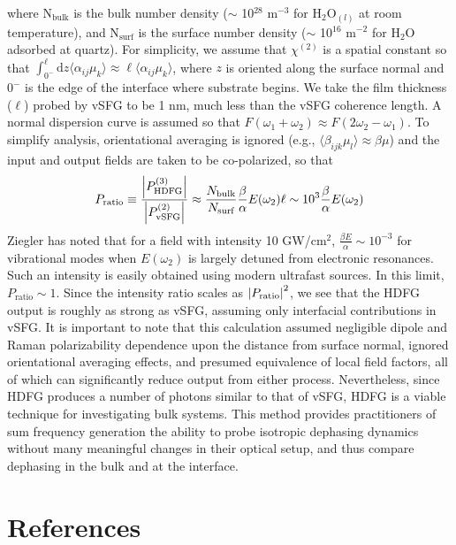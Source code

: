 \documentclass[aip, jcp, reprint, twocolumn]{revtex4-2}
\begin{document}
 where N$_\text{bulk}$ is the bulk number density ($\sim$ 10$^{28}$ m$^{-3}$ for H$_2$O$_{(l)}$ at room temperature), and N$_\text{surf}$ is the surface number density ($\sim$ 10$^{16}$ m$^{-2}$ for H$_2$O adsorbed at quartz).\cite{Du1994}	
 For simplicity, we assume that $\chi^{(2)}$ is a spatial constant so that $\int_{0^-}^\ell \mathrm{d}z \langle \alpha_{ij}\mu_{k} \rangle \approx \ell \langle \alpha_{ij}\mu_{k} \rangle$, where $z$ is oriented along the surface normal and $0^{-}$ is the edge of the interface where substrate begins. \cite{Su1998}
 We take the film thickness ($\ell$) probed by vSFG to be 1 nm, much less than the vSFG coherence length.\cite{RN133}
 A normal dispersion curve is assumed so that $F(\omega_1+\omega_2) \approx F(2\omega_2-\omega_1)$.
 To simplify analysis, orientational averaging is ignored (e.g., $\langle \beta_{ijk} \mu_{l} \rangle \approx \beta \mu$) and the input and output fields are taken to be co-polarized, so that
 \begin{equation}
	 		P_\text{ratio} \equiv \frac{\abs{P^{(3)}_{\text{HDFG}}}}{\abs{P^{(2)}_{\text{vSFG}}}} \approx \frac{N_\text{bulk}}{N_\text{surf}} \frac{\beta}{\alpha} E(\omega_2) \ell \sim 10^3 \frac{\beta}{\alpha} E(\omega_2)\\
	 \end{equation}
 Ziegler has noted that for a field with intensity 10 GW/cm$^{2}$, $\frac{\beta E}{\alpha} \sim 10^{-3} $ for vibrational modes when $E(\omega_2)$ is largely detuned from electronic resonances. \cite{RN515}
 Such an intensity is easily obtained using modern ultrafast sources.
 In this limit, $P_\text{ratio} \sim 1$.
 Since the intensity ratio scales as $\abs{P_\text{ratio}}^2$, we see that the HDFG output is roughly as strong as vSFG, assuming only interfacial contributions in vSFG.
 It is important to note that this calculation assumed negligible dipole and Raman polarizability dependence upon the distance from surface normal, ignored orientational averaging effects, and presumed equivalence of local field factors, all of which can significantly reduce output from either process. 
 Nevertheless, since HDFG produces a number of photons similar to that of vSFG, HDFG is a viable technique for investigating bulk systems.
 This method provides practitioners of sum frequency generation the ability to probe isotropic dephasing dynamics without many meaningful changes in their optical setup, and thus compare  dephasing in the bulk and at the interface.\cite{RN224}

\section{References}

\end{document}

